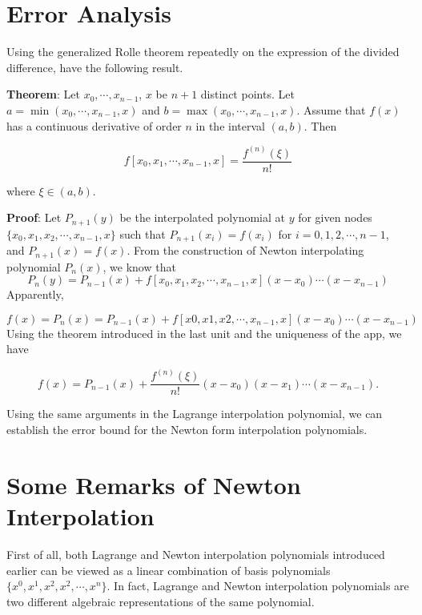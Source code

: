 \documentclass[
]{book}
\begin{document}
\hypertarget{error-analysis-6}{%
\section{Error Analysis}\label{error-analysis-6}}

Using the generalized Rolle theorem repeatedly on the expression of the divided difference, have the following result.

\textbf{Theorem}: Let \(x_0, \cdots , x_{n-1}\), \(x\) be \(n+1\) distinct points. Let \(a = \min (x_0, \cdots , x_{n-1}, x)\) and \(b = \max(x_0, \cdots , x_{n-1},x)\). Assume that \(f(x)\) has a continuous derivative of order \(n\) in the interval \((a, b)\). Then

\[
f[x_0, x_1, \cdots, x_{n-1}, x] = \frac{f^{(n)}(\xi)}{n!}
\]

where \(\xi \in (a, b)\).

\textbf{Proof}: Let \(P_{n+1}(y)\) be the interpolated polynomial at \(y\) for given nodes \(\{ x_0, x_1, x_2, \cdots, x_{n-1},x \}\) such that \(P_{n+1}(x_i) = f(x_i)\) for \(i = 0, 1, 2, \cdots, n-1\), and \(P_{n+1}(x) = f(x)\). From the construction of Newton interpolating polynomial \(P_n(x)\), we know that
\[
P_n(y) = P_{n-1}(x) + f[x_0, x_1, x_2, \cdots, x_{n-1},x] (x-x_0)\cdots(x-x_{n-1})
\]
Apparently,

\[
f(x) =P_n(x) = P_{n-1}(x) + f[x0, x1, x2, \cdots, x_{n-1},x] (x-x_0)\cdots(x-x_{n-1})
\]
Using the theorem introduced in the last unit and the uniqueness of the app, we have

\[
f(x) = P_{n-1}(x) + \frac{f^{(n)}(\xi)}{n!}(x-x_0)(x-x_1)\cdots(x-x_{n-1}).
\]

Using the same arguments in the Lagrange interpolation polynomial, we can establish the error bound for the Newton form interpolation polynomials.

\hypertarget{some-remarks-of-newton-interpolation}{%
\section{Some Remarks of Newton Interpolation}\label{some-remarks-of-newton-interpolation}}

First of all, both Lagrange and Newton interpolation polynomials introduced earlier can be viewed as a linear combination of basis polynomials \(\{x^0, x^1, x^2, x^2, \cdots, x^n \}\). In fact, Lagrange and Newton interpolation polynomials are two different algebraic representations of the same polynomial.
\end{document}
